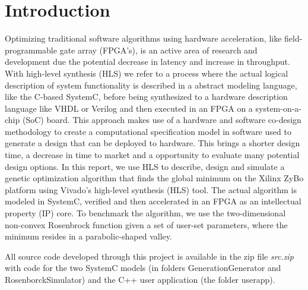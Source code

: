 \section{Introduction}
Optimizing traditional software algorithms using hardware acceleration, like field-programmable gate array (FPGA's), is an active area of research and development due the potential decrease in latency and increase in throughput. With high-level synthesis (HLS) we refer to a process where the actual logical description of system functionality is described in a abstract modeling language, like the C-based SystemC, before being synthesized to a hardware description language like VHDL or Verilog and then executed in an FPGA on a system-on-a-chip (SoC) board. This approach makes use of a hardware and software co-design methodology to create a computational specification model in software used to generate a design that can be deployed to hardware. This brings a shorter design time, a decrease in time to market and a opportunity to evaluate many potential design options. In this report, we use HLS to describe, design and simulate a genetic optimization algorithm that finds the global minimum on the Xilinx ZyBo platform using Vivado's high-level synthesis (HLS) tool. The actual algorithm is modeled in SystemC, verified and then accelerated in an FPGA as an intellectual property (IP) core. To benchmark the algorithm, we use the two-dimensional non-convex Rosenbrock function\cite{Shang2006} given a set of user-set parameters, where the minimum resides in a parabolic-shaped valley.

All source code developed through this project is available in the zip file \textit{src.zip} with code for the two SystemC models (in folders GenerationGenerator and RosenborckSimulator) and the C++ user application (the folder userapp).